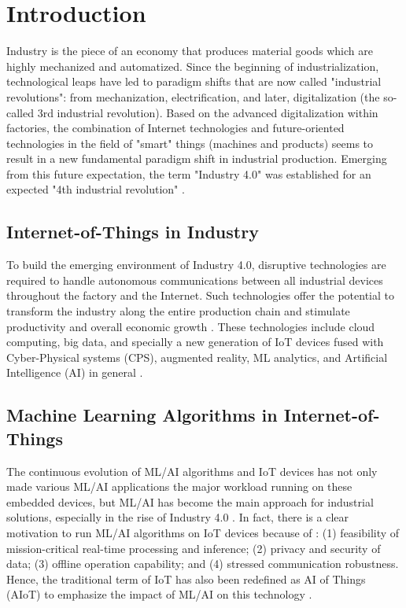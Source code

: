 \section{Introduction}
Industry is the piece of an economy that produces material goods which are highly mechanized and automatized. Since the beginning of industrialization, technological leaps have led to paradigm shifts that are now called "industrial revolutions": from mechanization, electrification, and later, digitalization (the so-called 3rd industrial revolution). Based on the advanced digitalization within factories, the combination of Internet technologies and future-oriented technologies in the field of "smart" things (machines and products) seems to result in a new fundamental paradigm shift in industrial production. Emerging from this future expectation, the term "Industry 4.0" was established for an expected "4th industrial revolution" \cite{lasi2014industry}.

\subsection{Internet-of-Things in Industry}
To build the emerging environment of Industry 4.0, disruptive technologies are required to handle autonomous communications between all industrial devices throughout the factory and the Internet. Such technologies offer the potential to transform the industry along the entire production chain and stimulate productivity and overall economic growth \cite{espinoza2020estimating}. These technologies include cloud computing, big data, and specially a new generation of IoT devices fused with Cyber-Physical systems (CPS), augmented reality, ML analytics, and Artificial Intelligence (AI) in general \cite{alcacer2019scanning}.

\subsection{Machine Learning Algorithms in Internet-of-Things}
The continuous evolution of ML/AI algorithms and IoT devices has not only made various ML/AI applications the major workload running on these embedded devices, but ML/AI has become the main approach for industrial solutions, especially in the rise of Industry 4.0 \cite{alcacer2019scanning}. In fact, there is a clear motivation to run ML/AI algorithms on IoT devices because of \cite{loh20201}: (1) feasibility of mission-critical real-time processing and inference; (2) privacy and security of data; (3) offline operation capability; and (4) stressed communication robustness. Hence, the traditional term of IoT has also been redefined as AI of Things (AIoT) to emphasize the impact of ML/AI on this technology \cite{zhang2020empowering}.

